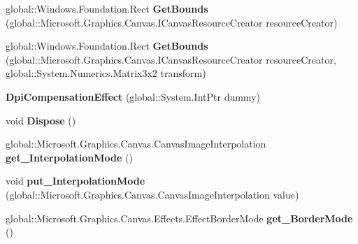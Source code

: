 \begin{DoxyCompactItemize}
global\+::\+Windows.\+Foundation.\+Rect {\bfseries Get\+Bounds} (global\+::\+Microsoft.\+Graphics.\+Canvas.\+I\+Canvas\+Resource\+Creator resource\+Creator)
\item 
\mbox{\label{class_microsoft_1_1_graphics_1_1_canvas_1_1_effects_1_1_dpi_compensation_effect_affcc94a3d3762f96011af355812faf07}} 
global\+::\+Windows.\+Foundation.\+Rect {\bfseries Get\+Bounds} (global\+::\+Microsoft.\+Graphics.\+Canvas.\+I\+Canvas\+Resource\+Creator resource\+Creator, global\+::\+System.\+Numerics.\+Matrix3x2 transform)
\item 
\mbox{\label{class_microsoft_1_1_graphics_1_1_canvas_1_1_effects_1_1_dpi_compensation_effect_a54141aa5d933a8cdc483ca29381329b9}} 
{\bfseries Dpi\+Compensation\+Effect} (global\+::\+System.\+Int\+Ptr dummy)
\item 
\mbox{\label{class_microsoft_1_1_graphics_1_1_canvas_1_1_effects_1_1_dpi_compensation_effect_af986b9bbf6e6ad3ab1adde3673a2c57c}} 
void {\bfseries Dispose} ()
\item 
\mbox{\label{class_microsoft_1_1_graphics_1_1_canvas_1_1_effects_1_1_dpi_compensation_effect_ab1505e3760906582e945043639fcfb16}} 
global\+::\+Microsoft.\+Graphics.\+Canvas.\+Canvas\+Image\+Interpolation {\bfseries get\+\_\+\+Interpolation\+Mode} ()
\item 
\mbox{\label{class_microsoft_1_1_graphics_1_1_canvas_1_1_effects_1_1_dpi_compensation_effect_ab95d5e8e9e140918df664c046fe70e53}} 
void {\bfseries put\+\_\+\+Interpolation\+Mode} (global\+::\+Microsoft.\+Graphics.\+Canvas.\+Canvas\+Image\+Interpolation value)
\item 
\mbox{\label{class_microsoft_1_1_graphics_1_1_canvas_1_1_effects_1_1_dpi_compensation_effect_a5640110355a62fb5ce7b280be6b2ead4}} 
global\+::\+Microsoft.\+Graphics.\+Canvas.\+Effects.\+Effect\+Border\+Mode {\bfseries get\+\_\+\+Border\+Mode} ()

\end{DoxyCompactItemize}
